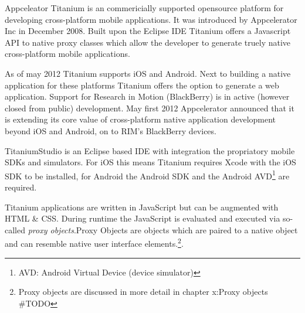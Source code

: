 



Appceleator Titanium is an commericially supported opensource platform for developing cross-platform mobile applications. It was introduced by Appcelerator Inc in December 2008. Built upon the Eclipse IDE Titanium offers a Javascript API to native proxy classes which allow the developer to generate truely native cross-platform mobile applications. 

As of may 2012 Titanium supports iOS and Android. Next to building a native application for these platforms Titanium offers the option to generate a web application. 
Support for Research in Motion (BlackBerry) is in active (however closed from public) development. May first 2012 Appcelerator announced that it is extending its core value of cross-platform native application development beyond iOS and Android, on to RIM's BlackBerry devices.\cite{Asher2012}

TitaniumStudio is an Eclipse based IDE with integration the propriatory mobile SDKs and simulators. For iOS this means Titanium requires Xcode with the iOS SDK to be installed, for Android the Android SDK and the Android AVD\footnote{AVD: Android Virtual Device (device simulator)} are required.

Titanium applications are written in JavaScript but can be augmented with HTML \& CSS. During runtime the JavaScript is evaluated and executed via so-called \emph{proxy objects}.Proxy Objects are objects which are paired to a native object and can resemble native user interface elements.\footnote{Proxy objects are discussed in more detail in chapter x:Proxy objects \#TODO}.


